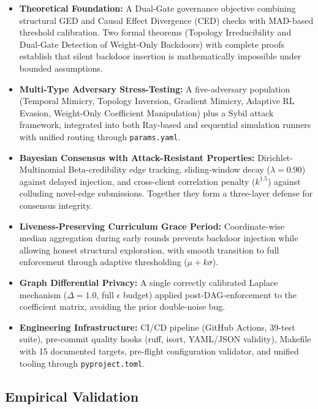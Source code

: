 \documentclass[journal]{IEEEtran}
\begin{document}
\begin{itemize}
\item \textbf{Theoretical Foundation:} A Dual-Gate governance objective combining structural GED and Causal Effect Divergence (CED) checks with MAD-based threshold calibration. Two formal theorems (Topology Irreducibility and Dual-Gate Detection of Weight-Only Backdoors) with complete proofs establish that silent backdoor insertion is mathematically impossible under bounded assumptions.

\item \textbf{Multi-Type Adversary Stress-Testing:} A five-adversary population (Temporal Mimicry, Topology Inversion, Gradient Mimicry, Adaptive RL Evasion, Weight-Only Coefficient Manipulation) plus a Sybil attack framework, integrated into both Ray-based and sequential simulation runners with unified routing through \texttt{params.yaml}.

\item \textbf{Bayesian Consensus with Attack-Resistant Properties:} Dirichlet-Multinomial Beta-credibility edge tracking, sliding-window decay ($\lambda=0.90$) against delayed injection, and cross-client correlation penalty ($k^{1.5}$) against colluding novel-edge submissions. Together they form a three-layer defense for consensus integrity.

\item \textbf{Liveness-Preserving Curriculum Grace Period:} Coordinate-wise median aggregation during early rounds prevents backdoor injection while allowing honest structural exploration, with smooth transition to full enforcement through adaptive thresholding ($\mu + k\sigma$).

\item \textbf{Graph Differential Privacy:} A single correctly calibrated Laplace mechanism ($\Delta=1.0$, full $\epsilon$ budget) applied post-DAG-enforcement to the coefficient matrix, avoiding the prior double-noise bug.

\item \textbf{Engineering Infrastructure:} CI/CD pipeline (GitHub Actions, 39-test suite), pre-commit quality hooks (ruff, isort, YAML/JSON validity), Makefile with 15 documented targets, pre-flight configuration validator, and unified tooling through \texttt{pyproject.toml}.
\end{itemize}

\subsection{Empirical Validation}
\end{document}

